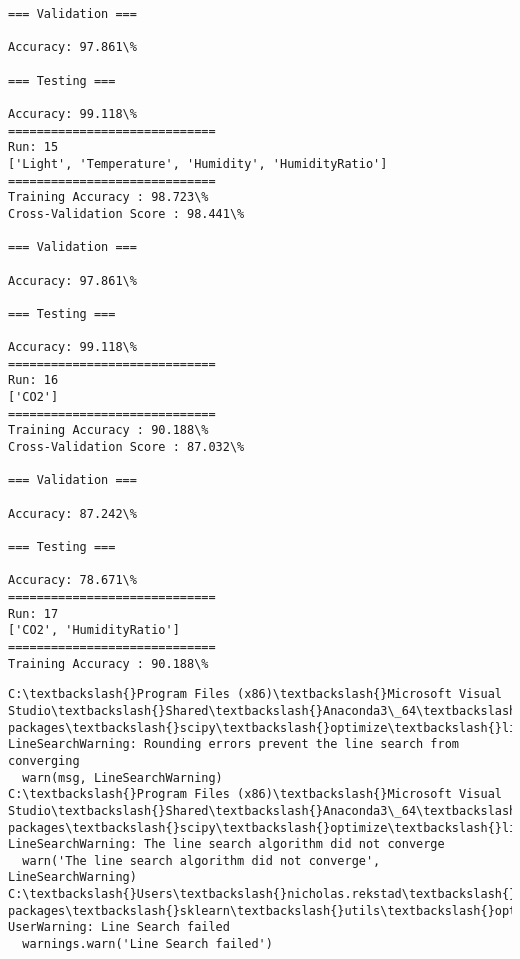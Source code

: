 \documentclass[11pt]{article}
\begin{document}
\begin{Verbatim}[commandchars=\\\{\}]
=== Validation ===

Accuracy: 97.861\%

=== Testing ===

Accuracy: 99.118\%
=============================
Run: 15
['Light', 'Temperature', 'Humidity', 'HumidityRatio']
=============================
Training Accuracy : 98.723\%
Cross-Validation Score : 98.441\%

=== Validation ===

Accuracy: 97.861\%

=== Testing ===

Accuracy: 99.118\%
=============================
Run: 16
['CO2']
=============================
Training Accuracy : 90.188\%
Cross-Validation Score : 87.032\%

=== Validation ===

Accuracy: 87.242\%

=== Testing ===

Accuracy: 78.671\%
=============================
Run: 17
['CO2', 'HumidityRatio']
=============================
Training Accuracy : 90.188\%

    \end{Verbatim}

    \begin{Verbatim}[commandchars=\\\{\}]
C:\textbackslash{}Program Files (x86)\textbackslash{}Microsoft Visual Studio\textbackslash{}Shared\textbackslash{}Anaconda3\_64\textbackslash{}lib\textbackslash{}site-packages\textbackslash{}scipy\textbackslash{}optimize\textbackslash{}linesearch.py:422: LineSearchWarning: Rounding errors prevent the line search from converging
  warn(msg, LineSearchWarning)
C:\textbackslash{}Program Files (x86)\textbackslash{}Microsoft Visual Studio\textbackslash{}Shared\textbackslash{}Anaconda3\_64\textbackslash{}lib\textbackslash{}site-packages\textbackslash{}scipy\textbackslash{}optimize\textbackslash{}linesearch.py:313: LineSearchWarning: The line search algorithm did not converge
  warn('The line search algorithm did not converge', LineSearchWarning)
C:\textbackslash{}Users\textbackslash{}nicholas.rekstad\textbackslash{}AppData\textbackslash{}Roaming\textbackslash{}Python\textbackslash{}Python36\textbackslash{}site-packages\textbackslash{}sklearn\textbackslash{}utils\textbackslash{}optimize.py:195: UserWarning: Line Search failed
  warnings.warn('Line Search failed')

    \end{Verbatim}
\end{document}
